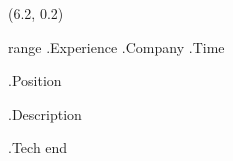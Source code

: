\begin{textblock}{15}(6.2, 0.2)

{{range .Experience}}
    {{.Company}} {{.Time}}

    {{.Position}}

    {{.Description}}

    {{.Tech}}
{{end}}


\end{textblock}
